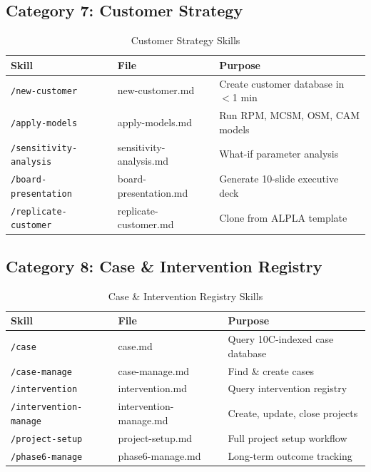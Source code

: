 \subsection{Category 7: Customer Strategy}

\begin{table}[htbp]
\centering
\begin{tabular}{|l|l|p{6cm}|}
\hline
\textbf{Skill} & \textbf{File} & \textbf{Purpose} \\
\hline
\texttt{/new-customer} & new-customer.md & Create customer database in $<$1 min \\
\texttt{/apply-models} & apply-models.md & Run RPM, MCSM, OSM, CAM models \\
\texttt{/sensitivity-analysis} & sensitivity-analysis.md & What-if parameter analysis \\
\texttt{/board-presentation} & board-presentation.md & Generate 10-slide executive deck \\
\texttt{/replicate-customer} & replicate-customer.md & Clone from ALPLA template \\
\hline
\end{tabular}
\caption{Customer Strategy Skills}
\end{table}


\subsection{Category 8: Case \& Intervention Registry}

\begin{table}[htbp]
\centering
\begin{tabular}{|l|l|p{6cm}|}
\hline
\textbf{Skill} & \textbf{File} & \textbf{Purpose} \\
\hline
\texttt{/case} & case.md & Query 10C-indexed case database \\
\texttt{/case-manage} & case-manage.md & Find \& create cases \\
\texttt{/intervention} & intervention.md & Query intervention registry \\
\texttt{/intervention-manage} & intervention-manage.md & Create, update, close projects \\
\texttt{/project-setup} & project-setup.md & Full project setup workflow \\
\texttt{/phase6-manage} & phase6-manage.md & Long-term outcome tracking \\
\hline
\end{tabular}
\caption{Case \& Intervention Registry Skills}
\end{table}


